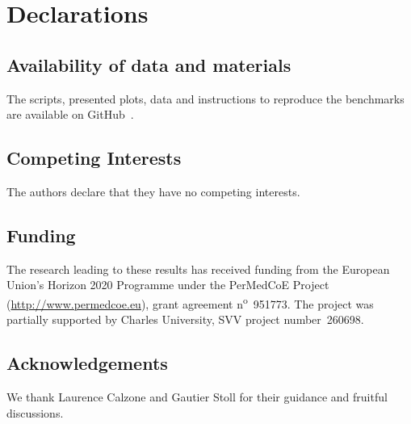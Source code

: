 \documentclass[sn-mathphys-num]{sn-jnl}%
\begin{document}
\backmatter

\section*{Declarations}


\subsection*{Availability of data and materials}

The scripts, presented plots, data and instructions to reproduce the benchmarks are available on GitHub~\cite{adam_smelko_2024_10853153}.

\subsection*{Competing Interests}
The authors declare that they have no competing interests.

\subsection*{Funding}
The research leading to these results has received funding from the European Union's Horizon 2020 Programme under the PerMedCoE Project (\url{http://www.permedcoe.eu}), grant agreement n\textsuperscript{o}~951773.
The project was partially supported by Charles University, SVV project number~260698.

\subsection*{Acknowledgements}
We thank Laurence Calzone and Gautier Stoll for their guidance and fruitful discussions.


\end{document}
